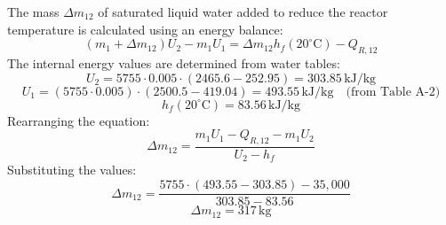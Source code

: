 The mass \( \Delta m_{12} \) of saturated liquid water added to reduce the reactor temperature is calculated using an energy balance:  
\[
(m_1 + \Delta m_{12}) U_2 - m_1 U_1 = \Delta m_{12} h_f(20^\circ\text{C}) - Q_{R,12}
\]  
The internal energy values are determined from water tables:  
\[
U_2 = 5755 \cdot 0.005 \cdot (2465.6 - 252.95) = 303.85 \, \text{kJ/kg}
\]  
\[
U_1 = (5755 \cdot 0.005) \cdot (2500.5 - 419.04) = 493.55 \, \text{kJ/kg} \quad \text{(from Table A-2)}
\]  
\[
h_f(20^\circ\text{C}) = 83.56 \, \text{kJ/kg}
\]  
Rearranging the equation:  
\[
\Delta m_{12} = \frac{m_1 U_1 - Q_{R,12} - m_1 U_2}{U_2 - h_f}
\]  
Substituting the values:  
\[
\Delta m_{12} = \frac{5755 \cdot (493.55 - 303.85) - 35,000}{303.85 - 83.56}
\]  
\[
\Delta m_{12} = 317 \, \text{kg}
\]